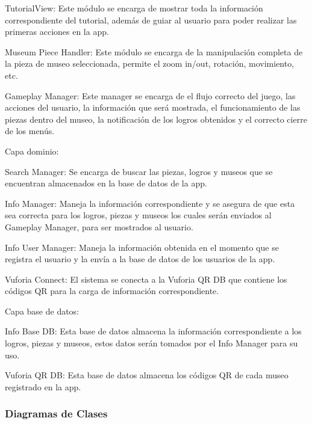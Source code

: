 \documentclass[12pt]{article}
\begin{document}
TutorialView: Este módulo se encarga de mostrar toda la información correspondiente del tutorial, además de guiar al usuario para poder realizar las primeras acciones en la app.

Museum Piece Handler: Este módulo se encarga de la manipulación completa de la pieza de museo seleccionada, permite el zoom in/out, rotación, movimiento, etc.

Gameplay Manager:  Este manager se encarga de el flujo correcto del juego, las acciones del usuario, la información que será mostrada, el funcionamiento de las piezas dentro del museo, la notificación de los logros obtenidos y el correcto cierre de los menús.

Capa dominio:

Search Manager: Se encarga de buscar las piezas, logros y museos que se encuentran almacenados en la base de datos de la app.

Info Manager: Maneja la información correspondiente y se asegura de que esta sea correcta para  los logros, piezas y museos los cuales serán enviados al Gameplay Manager, para ser mostrados al usuario.

Info User Manager: Maneja la información obtenida en el momento que se registra el usuario y la envía a la base de datos de los usuarios de la app.

Vuforia Connect: El sistema se conecta a la Vuforia QR DB que contiene los códigos QR para la carga de información correspondiente.

Capa base de datos:

Info Base DB: Esta base de datos almacena la información correspondiente a los logros, piezas y museos, estos datos serán tomados por el Info Manager para su uso.

Vuforia QR DB: Esta base de datos almacena los códigos QR de cada museo registrado en la app. 


\subsubsection{Diagramas de Clases}
\end{document}
